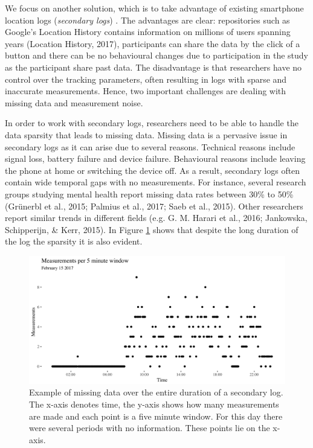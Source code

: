 \documentclass[man]{apa6}
\theoremstyle{definition}
\theoremstyle{definition}
\theoremstyle{definition}
\theoremstyle{remark}
\begin{document}
We focus on another solution, which is to take advantage of existing
smartphone location logs (\emph{secondary logs}) . The advantages are
clear: repositories such as Google's Location History contains
information on millions of users spanning years (Location History,
2017), participants can share the data by the click of a button and
there can be no behavioural changes due to participation in the study as
the participant share past data. The disadvantage is that researchers
have no control over the tracking parameters, often resulting in logs
with sparse and inaccurate measurements. Hence, two important challenges
are dealing with missing data and measurement noise.

In order to work with secondary logs, researchers need to be able to
handle the data sparsity that leads to missing data. Missing data is a
pervasive issue in secondary logs as it can arise due to several
reasons. Technical reasons include signal loss, battery failure and
device failure. Behavioural reasons include leaving the phone at home or
switching the device off. As a result, secondary logs often contain wide
temporal gaps with no measurements. For instance, several research
groups studying mental health report missing data rates between 30\% to
50\% (Grünerbl et al., 2015; Palmius et al., 2017; Saeb et al., 2015).
Other researchers report similar trends in different fields (e.g. G. M.
Harari et al., 2016; Jankowska, Schipperijn, \& Kerr, 2015). In Figure
\ref{fig:longMeasurementsPerDay} shows that despite the long duration of
the log the sparsity it is also evident.

\begin{figure}
\includegraphics[width=1\linewidth]{img/missin5minExample2018} \caption{Example of missing data over the entire duration of a secondary log. The x-axis denotes time, the y-axis shows how many measurements are made and each point is a five minute window. For this day there were several periods with no information. These points lie on the x-axis.}\label{fig:longMeasurementsPerDay}
\end{figure}
\end{document}
